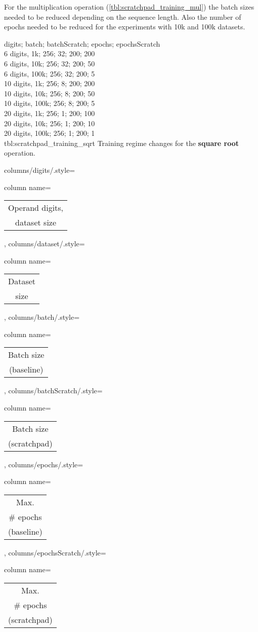 For the multiplication operation (\cref{tbl:scratchpad_training_mul}) the batch sizes needed to be reduced depending on the sequence length. Also the number of epochs needed to be reduced for the experiments with 10k and 100k datasets.

{
	digits; batch; batchScratch; epochs; epochsScratch\\
	6 digits,  1k;  256; 32; 200; 200\\
	6 digits,  10k;  256; 32; 200; 50\\
	6 digits,  100k;  256; 32; 200; 5\\
	10 digits,  1k;  256; 8; 200; 200\\
	10 digits,  10k;  256; 8; 200; 50\\
	10 digits,  100k;  256; 8; 200; 5\\
	20 digits,  1k;  256; 1; 200; 100\\
	20 digits,  10k;  256; 1; 200; 10\\
	20 digits,  100k;  256; 1; 200; 1\\
}
{tbl:scratchpad_training_sqrt}
{
	Training regime changes for the \textbf{square root} operation.
}
{%
	columns/digits/.style={column name={\begin{tabular}{c}
				Operand digits, \\
				dataset size
	\end{tabular}}},
	columns/dataset/.style={column name={\begin{tabular}{c}
				Dataset \\
				size
	\end{tabular}}},
	columns/batch/.style={column name={\begin{tabular}{c}
				Batch size \\
				(baseline)
	\end{tabular}}},
	columns/batchScratch/.style={column name={\begin{tabular}{c}
				Batch size \\
				(scratchpad)
	\end{tabular}}},
	columns/epochs/.style={column name={\begin{tabular}{c}
				Max. \\
				\# epochs \\
				(baseline)
	\end{tabular}}},
	columns/epochsScratch/.style={column name={\begin{tabular}{c}
				Max. \\
				\# epochs \\
				(scratchpad)
	\end{tabular}}}
}

